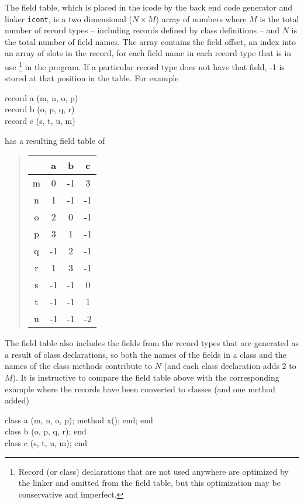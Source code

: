 The field table, which is placed in the icode by the back end code generator
and linker \texttt{icont}, is a two dimensional ($N{\times}M$) array of
numbers where $M$ is the total number of record types -- including records
defined by class definitions -- and $N$ is the total number of field
names. The array contains the field offset, an index into an array of slots
in the record, for each field name in each record type that is in use%
\footnote{
Record (or class) declarations that are not used anywhere are optimized
by the linker and omitted from the field table, but this optimization may
be conservative and imperfect.
}
in the program. If a particular record type does not have that field, -1 is
stored at that position in the table.
For example
\begin{iconcode}
record a (m, n, o, p)\\
record b (o, p, q, r)\\
record c (s, t, u, m)\\
\end{iconcode}
has a resulting field table of
{\small
\begin{quote}
\begin{tabular}{|c|c|c|c|}
    \hline 
       & a  & b  & c  \\ \hline
    m  & 0  & -1 &  3 \\ \hline
    n  & 1  & -1 & -1 \\ \hline
    o  & 2  &  0 & -1 \\ \hline
    p  & 3  &  1 & -1 \\ \hline
    q  & -1 &  2 & -1 \\ \hline
    r  & 1  &  3 & -1 \\ \hline
    s  & -1 & -1 &  0 \\ \hline
    t  & -1 & -1 &  1 \\ \hline
    u  & -1 & -1 & -2 \\ \hline
 \end{tabular}
\end{quote}
}
The field table also includes the fields from the record types that are
generated as a result of class declarations, so both the names of the fields
in a class and the names of the class methods contribute to $N$ (and each
class declaration adds 2 to $M$). It is instructive to compare the field
table above with the corresponding example where the records have been
converted to classes (and one method added)
\begin{iconcode}
class a (m, n, o, p); method x(); end; end\\
class b (o, p, q, r); end\\
class c (s, t, u, m); end\\
\end{iconcode}
